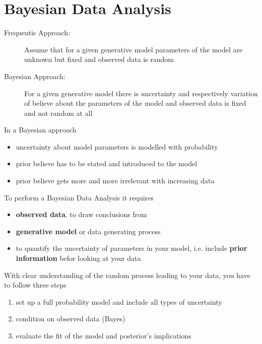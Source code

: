 \section{Bayesian Data Analysis}
\begin{description}
\item[Frequentis Approach:] Assume that for a given generative model parameters
of the model are unknown but fixed and observed data is random
\item[Bayesian Approach:] For a given generative model there is uncertainty and
respectively variation of believe about the parameters of the model and
observed data is fixed and not random at all
\end{description}

In a Bayesian approach
\begin{itemize}
\item uncertainty about model parameters is modelled with probability
\item prior believe has to be stated and introduced to the model
\item prior believe gets more and more irrelevant with increasing data
\end{itemize}

To perform a Bayesian Data Analysis it requires
\begin{itemize}
\item \textbf{observed data}, to draw conclusions from
\item \textbf{generative model} or data generating process
\item to quantify the uncertainty of parameters in your model,
i.e. include \textbf{prior information} befor looking at your data
\end{itemize}

With clear understanding of the random process leading to your data,
you have to follow three steps
\begin{enumerate}
\item set up a full probability model and include all types of uncertainty
\item condition on observed data (Bayes)
\item evaluate the fit of the model and posterior's implications
\end{enumerate}

